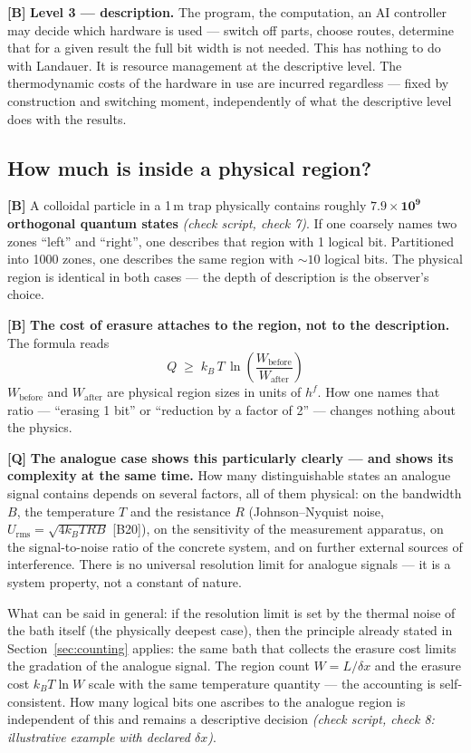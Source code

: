 \textbf{[B]} \textbf{Level 3 --- description.} The program, the computation, an AI
controller may decide which hardware is used --- switch off parts, choose routes,
determine that for a given result the full bit width is not needed. This has
nothing to do with Landauer. It is resource management at the descriptive level.
The thermodynamic costs of the hardware in use are incurred regardless --- fixed
by construction and switching moment, independently of what the descriptive level
does with the results.

\subsection{How much is inside a physical region?}

\textbf{[B]} A colloidal particle in a 1\,\textmu m trap physically contains roughly
$\mathbf{7.9\times10^{9}}$ \textbf{orthogonal quantum states}
\emph{(check script, check 7)}. If one coarsely names two zones “left” and “right”, one describes
that region with 1 logical bit. Partitioned into 1000 zones, one describes the
same region with ${\sim}10$ logical bits. The physical region is identical in both
cases --- the depth of description is the observer's choice.

\textbf{[B]} \textbf{The cost of erasure attaches to the region, not to the description.}
The formula reads
\[
  \boxed{\;Q \;\ge\; k_B\,T\,\ln\!\left(\frac{W_{\text{before}}}{W_{\text{after}}}\right)\;}
\]
$W_{\text{before}}$ and $W_{\text{after}}$ are physical region sizes in units of
$h^f$. How one names that ratio --- “erasing 1 bit” or “reduction by a factor of
2” --- changes nothing about the physics.

\textbf{[Q]} \textbf{The analogue case shows this particularly clearly --- and shows its
complexity at the same time.} How many distinguishable states an analogue signal
contains depends on several factors, all of them physical: on the bandwidth $B$,
the temperature $T$ and the resistance $R$ (Johnson--Nyquist noise,
$U_{\text{rms}} = \sqrt{4 k_B T R B}$ [B20]), on the sensitivity of the
measurement apparatus, on the signal-to-noise ratio of the concrete system, and on
further external sources of interference. There is no universal resolution limit
for analogue signals --- it is a system property, not a constant of nature.

What can be said in general: if the resolution limit is set by the thermal noise
of the bath itself (the physically deepest case), then the principle already
stated in Section~\ref{sec:counting} applies: the same bath that collects the
erasure cost limits the gradation of the analogue signal. The region count
$W = L/\delta x$ and the erasure cost $k_B T \ln W$ scale with the same
temperature quantity --- the accounting is self-consistent. How many logical bits
one ascribes to the analogue region is independent of this and remains a
descriptive decision \emph{(check script, check 8: illustrative example with declared
$\delta x$)}.

